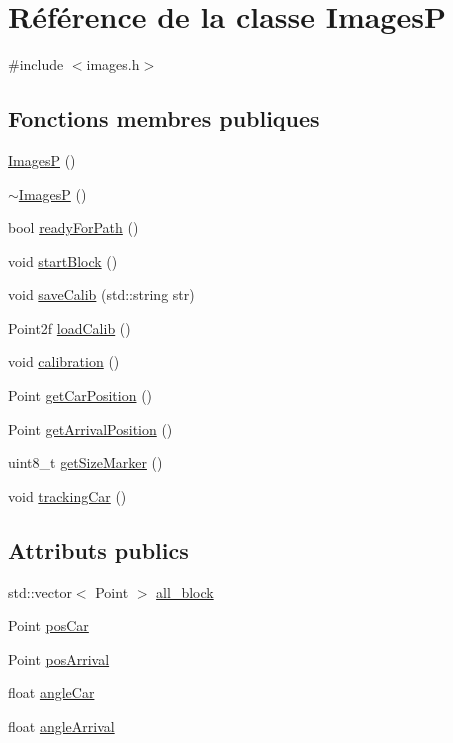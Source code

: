 \hypertarget{class_images_p}{\section{Référence de la classe Images\-P}
\label{class_images_p}
}


{\ttfamily \#include $<$images.\-h$>$}

\subsection*{Fonctions membres publiques}
\begin{DoxyCompactItemize}
\item 
\hyperlink{class_images_p_a18ff58308b1ba5787e1d05f0acd7224a}{Images\-P} ()
\item 
\hyperlink{class_images_p_abd4ea58f9cb814dbb27feb5d2d793e53}{$\sim$\-Images\-P} ()
\item 
bool \hyperlink{class_images_p_a3c43049bf1ce2da9ffa88841e48c29e1}{ready\-For\-Path} ()
\item 
void \hyperlink{class_images_p_ae2aecf8db20e7b3bcd14a7182dfdaf29}{start\-Block} ()
\item 
void \hyperlink{class_images_p_aeb7483dee60e755fffcc9e6f9355fd43}{save\-Calib} (std\-::string str)
\item 
Point2f \hyperlink{class_images_p_a4048e5f515cb51cbf25211ec8b4854b7}{load\-Calib} ()
\item 
void \hyperlink{class_images_p_a799c4550d96659d7d188b03f52bb9f4a}{calibration} ()
\item 
Point \hyperlink{class_images_p_afe9cff50f49fc67bd8938d8d0223fe81}{get\-Car\-Position} ()
\item 
Point \hyperlink{class_images_p_aaf0d33634f747f1defec833fbc6dfae2}{get\-Arrival\-Position} ()
\item 
uint8\-\_\-t \hyperlink{class_images_p_a002bb2f3148a85c46c954dcc98ad2760}{get\-Size\-Marker} ()
\item 
void \hyperlink{class_images_p_adf17333e9b35092e96fef60bbbf80d74}{tracking\-Car} ()
\end{DoxyCompactItemize}
\subsection*{Attributs publics}
\begin{DoxyCompactItemize}
\item 
std\-::vector$<$ Point $>$ \hyperlink{class_images_p_ab9e279526694a7ce421cfa11b9309ed1}{all\-\_\-block}
\item 
Point \hyperlink{class_images_p_a79d1d01bae703caeee1033425e4f8f18}{pos\-Car}
\item 
Point \hyperlink{class_images_p_a621b649c63d3967849103c03082af64c}{pos\-Arrival}
\item 
float \hyperlink{class_images_p_a39c69bdd9469b4b8a2c9666e27afa7b0}{angle\-Car}
\item 
float \hyperlink{class_images_p_a408c61aeceb9175481adb2daca707a48}{angle\-Arrival}
\end{DoxyCompactItemize}
